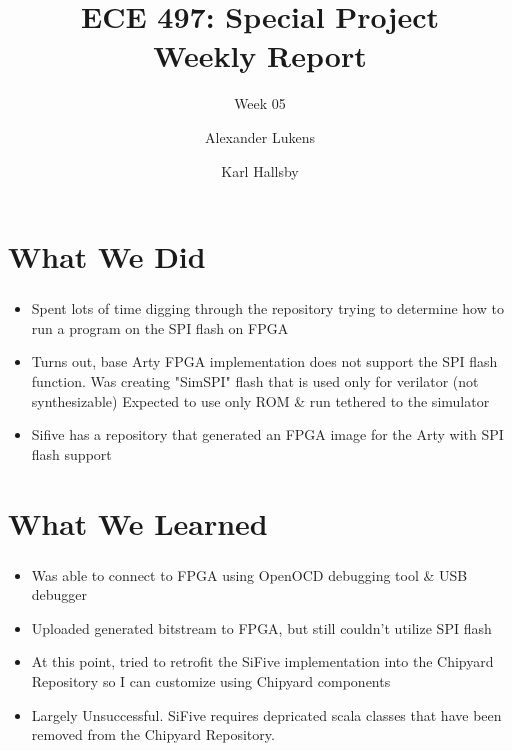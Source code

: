 \documentclass{../weeklyslides}
\title[Weekly Report]{ECE 497: Special Project \\ Weekly Report}
\subtitle{Week 05}
\author{Alexander Lukens \and Karl Hallsby}
\institute{Illinois Institute of Technology}
\date{\DTMdisplaydate{2021}{2}{25}{-1}}
\begin{document}
\nocite{chipyard}

\begin{frame}
  \titlepage{}
\end{frame}

\section{What We Did}\label{sec:What_We_Did}
\begin{frame}
  \frametitle{}
  \begin{itemize}
  	\item Spent lots of time digging through the repository trying to determine how to run a program on the SPI flash on FPGA
  	\item Turns out, base Arty FPGA implementation does not support the SPI flash function. Was creating "SimSPI" flash that is used only for verilator (not synthesizable) Expected to use only ROM \& run tethered to the simulator
  	\item Sifive has a repository that generated an FPGA image for the Arty with SPI flash support
  \end{itemize}
  
\end{frame}

\section{What We Learned}\label{sec:What_We_Learned}
\begin{frame}
  \frametitle{}
  \begin{itemize}
  	\item Was able to connect to FPGA using OpenOCD debugging tool \& USB debugger
  	\item Uploaded generated bitstream to FPGA, but still couldn't utilize SPI flash
  	\item At this point, tried to retrofit the SiFive implementation into the Chipyard Repository so I can customize using Chipyard components
  	\item Largely Unsuccessful. SiFive requires depricated scala classes that have been removed from the Chipyard Repository.
  \end{itemize}
  
  \end{frame}
\end{document}
